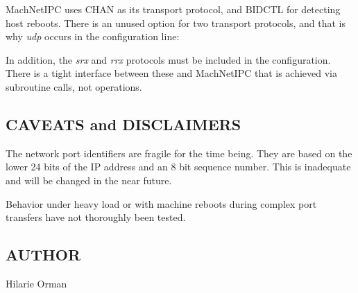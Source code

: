 MachNetIPC uses CHAN as its transport protocol, and BIDCTL for detecting
host reboots.  There is an unused option for two transport protocols, and
that is why {\em udp } occurs in the configuration line:


In addition, the {\em srx} and {\em rrx} protocols must be included in
the configuration.  There is a tight interface between these and MachNetIPC
that is achieved via subroutine calls, not \xk{} operations.

\subsection*{CAVEATS and DISCLAIMERS}

The network port identifiers are fragile for the time
being.  They are based on the lower 24 bits of the IP address
and an 8 bit sequence number.  This is inadequate and will be
changed in the near future.

Behavior under heavy load or with machine reboots during complex
port transfers have not thoroughly been tested.

\subsection*{AUTHOR}

\noindent Hilarie Orman
